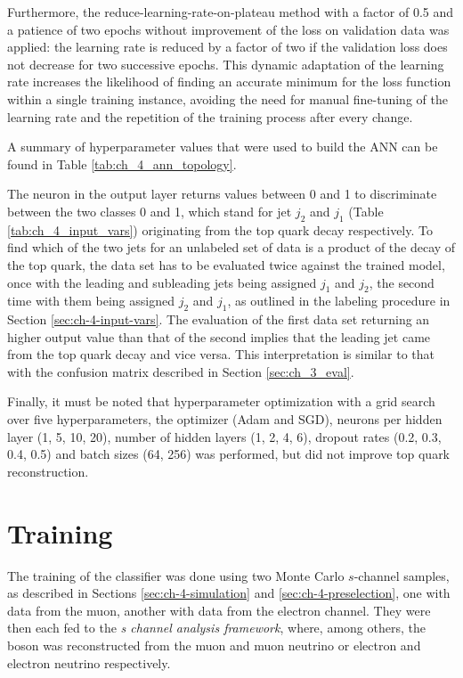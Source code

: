 Furthermore, the reduce-learning-rate-on-plateau method with a factor of 0.5 and a patience of two epochs without improvement of the loss on validation data was applied: the learning rate is reduced by a factor of two if the validation loss does not decrease for two successive epochs. This dynamic adaptation of the learning rate increases the likelihood of finding an accurate minimum for the loss function within a single training instance, avoiding the need for manual fine-tuning of the learning rate and the repetition of the training process after every change.

A summary of hyperparameter values that were used to build the ANN can be found in Table \ref{tab:ch_4_ann_topology}.

The neuron in the output layer returns values between 0 and 1 to discriminate between the two classes 0 and 1, which stand for jet $j_2$ and $j_1$ (Table \ref{tab:ch_4_input_vars}) originating from the top quark decay respectively. To find which of the two \Pbottom jets for an unlabeled set of data is a product of the decay of the top quark, the data set has to be evaluated twice against the trained model, once with the leading and subleading jets being assigned $j_1$ and $j_2$, the second time with them being assigned $j_2$ and $j_1$, as outlined in the labeling procedure in Section \ref{sec:ch-4-input-vars}. The evaluation of the first data set returning an higher output value than that of the second implies that the leading jet came from the top quark decay and vice versa. This interpretation is similar to that with the confusion matrix described in Section \ref{sec:ch_3_eval}.

Finally, it must be noted that hyperparameter optimization with a grid search over five hyperparameters, the optimizer (Adam and SGD), neurons per hidden layer (1, 5, 10, 20), number of hidden layers (1, 2, 4, 6), dropout rates (0.2, 0.3, 0.4, 0.5) and batch sizes (64, 256) was performed, but did not improve top quark reconstruction.

\section{Training}
\label{sec:ch-4-training}
The training of the classifier was done using two Monte Carlo $s$-channel samples, as described in Sections \ref{sec:ch-4-simulation} and \ref{sec:ch-4-preselection}, one with data from the muon, another with data from the electron channel. They were then each fed to the \emph{s channel analysis framework}, where, among others, the \PW boson was reconstructed from the muon and muon neutrino or electron and electron neutrino respectively.

